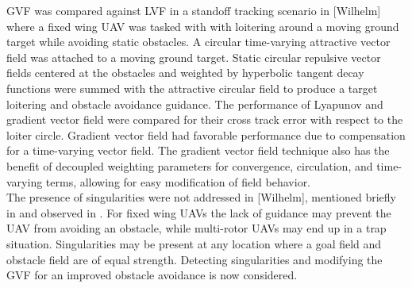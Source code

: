 \documentclass[conf]{new-aiaa}
\begin{document}
GVF was compared against LVF in a standoff tracking scenario in [Wilhelm] where a fixed wing UAV was tasked with with loitering around a moving ground target while avoiding static obstacles.  A circular time-varying attractive vector field was attached to a moving ground target. Static circular repulsive vector fields centered at the obstacles and weighted by hyperbolic tangent decay functions were summed with the attractive circular field to produce a target loitering and obstacle avoidance guidance. The performance of Lyapunov \cite{frew_cooperative_2007} and gradient vector field \cite{goncalves_artificial_2009,goncalves_circulation_2010,goncalves_vector_2010} were compared for their cross track error with respect to the loiter circle. Gradient vector field had favorable performance due to compensation for a time-varying vector field. The gradient vector field technique also has the benefit of decoupled weighting parameters for convergence, circulation, and time-varying terms, allowing for easy modification of field behavior. \\

The presence of singularities were not addressed in [Wilhelm], mentioned briefly in \cite{nelson_cooperative_2005} and observed in \cite{panagou_motion_2014}. For fixed wing UAVs the lack of guidance may prevent the UAV from avoiding an obstacle, while multi-rotor UAVs may end up in a trap situation. Singularities may be present at any location where a goal field and obstacle field are of equal strength. Detecting singularities and modifying the GVF for an improved obstacle avoidance is now considered.

%
\end{document}
